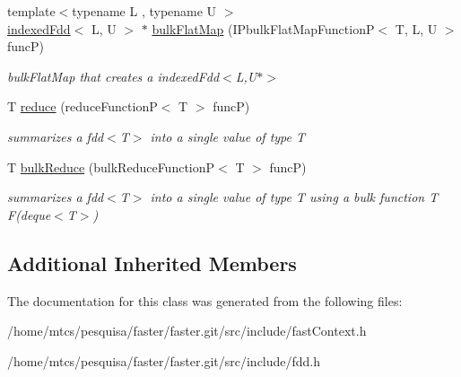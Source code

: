 \begin{DoxyCompactItemize}
{\footnotesize template$<$typename L , typename U $>$ }\\\hyperlink{classfaster_1_1indexedFdd}{indexed\+Fdd}$<$ L, U $>$ $\ast$ \hyperlink{group__bulk_gaf16d4811371f6dbcfbb717a73a182d48}{bulk\+Flat\+Map} (I\+Pbulk\+Flat\+Map\+FunctionP$<$ T, L, U $>$ funcP)
\begin{DoxyCompactList}\small\item\em bulk\+Flat\+Map that creates a indexed\+Fdd$<$\+L,\+U$\ast$$>$ \end{DoxyCompactList}\item 
T \hyperlink{group__reduce_ga1e828ad9a768db382aef2adf878aa1b2}{reduce} (reduce\+FunctionP$<$ T $>$ funcP)
\begin{DoxyCompactList}\small\item\em summarizes a fdd$<$\+T$>$ into a single value of type T \end{DoxyCompactList}\item 
T \hyperlink{group__bulk_ga8f133f23bd653329f44290ebda70bb9b}{bulk\+Reduce} (bulk\+Reduce\+FunctionP$<$ T $>$ funcP)
\begin{DoxyCompactList}\small\item\em summarizes a fdd$<$\+T$>$ into a single value of type T using a bulk function {\itshape T F(deque$<$\+T$>$)} \end{DoxyCompactList}\end{DoxyCompactItemize}
\subsection*{Additional Inherited Members}


The documentation for this class was generated from the following files\+:\begin{DoxyCompactItemize}
\item 
/home/mtcs/pesquisa/faster/faster.\+git/src/include/fast\+Context.\+h\item 
/home/mtcs/pesquisa/faster/faster.\+git/src/include/fdd.\+h\end{DoxyCompactItemize}
